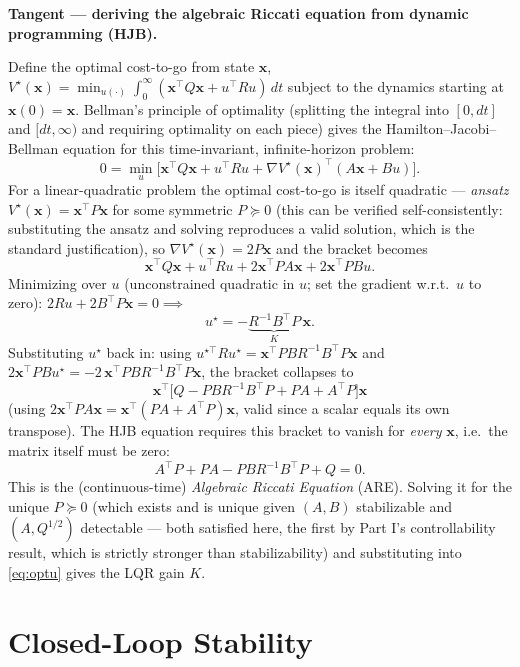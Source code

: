 \documentclass[11pt]{article}
\newenvironment{tangent}[1]{%
  \par\smallskip\noindent\hrulefill\par
  \noindent\textbf{Tangent — #1.}\par\smallskip
  \begingroup\itshape
}{%
  \endgroup
  \par\noindent\hrulefill\par\smallskip
}
\newcommand{\mb}[1]{\mathbf{#1}}
\begin{document}
\begin{tangent}{deriving the algebraic Riccati equation from dynamic
programming (HJB)}
Define the optimal cost-to-go from state $\mb x$, $V^\star(\mb x) =
\min_{u(\cdot)}\int_0^\infty(\mb x^\top Q\mb x+u^\top Ru)\,dt$ subject to
the dynamics starting at $\mb x(0)=\mb x$. Bellman's principle of
optimality (splitting the integral into $[0,dt]$ and $[dt,\infty)$ and
requiring optimality on each piece) gives the Hamilton--Jacobi--Bellman
equation for this time-invariant, infinite-horizon problem:
\[
  0 = \min_{u}\Big[\mb x^\top Q\mb x + u^\top Ru +
  \nabla V^\star(\mb x)^\top(A\mb x + Bu)\Big].
\]
For a linear-quadratic problem the optimal cost-to-go is itself quadratic
— \emph{ansatz} $V^\star(\mb x) = \mb x^\top P\mb x$ for some symmetric
$P\succeq0$ (this can be verified self-consistently: substituting the
ansatz and solving reproduces a valid solution, which is the standard
justification), so $\nabla V^\star(\mb x) = 2P\mb x$ and the bracket
becomes
\[
  \mb x^\top Q\mb x + u^\top Ru + 2\mb x^\top PA\mb x + 2\mb x^\top PBu.
\]
Minimizing over $u$ (unconstrained quadratic in $u$; set the gradient
w.r.t.\ $u$ to zero): $2Ru + 2B^\top P\mb x = 0 \implies$
\begin{equation}
  u^\star = -\underbrace{R^{-1}B^\top P}_{K}\,\mb x. \label{eq:optu}
\end{equation}
Substituting $u^\star$ back in: using $u^{\star\top}Ru^\star =
\mb x^\top PBR^{-1}B^\top P\mb x$ and $2\mb x^\top PBu^\star =
-2\,\mb x^\top PBR^{-1}B^\top P\mb x$, the bracket collapses to
\[
  \mb x^\top\Big[Q - PBR^{-1}B^\top P + PA + A^\top P\Big]\mb x
\]
(using $2\mb x^\top PA\mb x = \mb x^\top(PA+A^\top P)\mb x$, valid since a
scalar equals its own transpose). The HJB equation requires this bracket
to vanish for \emph{every} $\mb x$, i.e.\ the matrix itself must be zero:
\begin{equation}
  A^\top P + PA - PBR^{-1}B^\top P + Q = 0. \label{eq:are}
\end{equation}
This is the (continuous-time) \emph{Algebraic Riccati Equation} (ARE).
Solving it for the unique $P\succeq0$ (which exists and is unique given
$(A,B)$ stabilizable and $(A,Q^{1/2})$ detectable — both satisfied here,
the first by Part I's controllability result, which is strictly stronger
than stabilizability) and substituting into \eqref{eq:optu} gives the LQR
gain $K$.
\end{tangent}

\section{Closed-Loop Stability}
\end{document}
